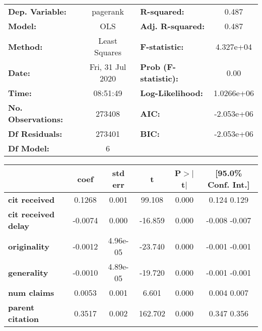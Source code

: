 \begin{center}
\begin{tabular}{lclc}
\toprule
\textbf{Dep. Variable:}     &     pagerank     & \textbf{  R-squared:         } &       0.487    \\
\textbf{Model:}             &       OLS        & \textbf{  Adj. R-squared:    } &       0.487    \\
\textbf{Method:}            &  Least Squares   & \textbf{  F-statistic:       } &   4.327e+04    \\
\textbf{Date:}              & Fri, 31 Jul 2020 & \textbf{  Prob (F-statistic):} &       0.00     \\
\textbf{Time:}              &     08:51:49     & \textbf{  Log-Likelihood:    } &   1.0266e+06   \\
\textbf{No. Observations:}  &      273408      & \textbf{  AIC:               } &   -2.053e+06   \\
\textbf{Df Residuals:}      &      273401      & \textbf{  BIC:               } &   -2.053e+06   \\
\textbf{Df Model:}          &           6      & \textbf{                     } &                \\
\bottomrule
\end{tabular}
\begin{tabular}{lccccc}
                            & \textbf{coef} & \textbf{std err} & \textbf{t} & \textbf{P$>$$|$t$|$} & \textbf{[95.0\% Conf. Int.]}  \\
\midrule
\textbf{cit received}       &       0.1268  &        0.001     &    99.108  &         0.000        &         0.124     0.129       \\
\textbf{cit received delay} &      -0.0074  &        0.000     &   -16.859  &         0.000        &        -0.008    -0.007       \\
\textbf{originality}        &      -0.0012  &     4.96e-05     &   -23.740  &         0.000        &        -0.001    -0.001       \\
\textbf{generality}         &      -0.0010  &     4.89e-05     &   -19.720  &         0.000        &        -0.001    -0.001       \\
\textbf{num claims}         &       0.0053  &        0.001     &     6.601  &         0.000        &         0.004     0.007       \\
\textbf{parent citation}    &       0.3517  &        0.002     &   162.702  &         0.000        &         0.347     0.356       \\

\end{tabular}
\end{center}
